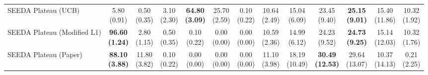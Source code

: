 \begin{table}[H]
{\begin{tabular}{l|cccccc|cccccc}
SEEDA Plateau (UCB) & \makecell{5.80 \\ (0.91)} & \makecell{0.50 \\ (0.35)} & {\cellcolor[HTML]{C8E6C9}} \makecell{3.10 \\ (2.30)} & \bfseries \makecell{64.80 \\ (3.09)} & \makecell{25.70 \\ (2.59)} & \makecell{0.10 \\ (0.22)} & \makecell{10.64 \\ (2.49)} & \makecell{15.04 \\ (6.09)} & {\cellcolor[HTML]{C8E6C9}} \makecell{23.45 \\ (9.40)} & \bfseries \makecell{25.15 \\ (9.01)} & \makecell{15.40 \\ (11.86)} & \makecell{10.32 \\ (1.92)} \\
SEEDA Plateau (Modified L1) & \bfseries \makecell{96.60 \\ (1.24)} & \makecell{2.80 \\ (1.15)} & {\cellcolor[HTML]{C8E6C9}} \makecell{0.50 \\ (0.35)} & \makecell{0.10 \\ (0.22)} & \makecell{0.00 \\ (0.00)} & \makecell{0.00 \\ (0.00)} & \makecell{10.59 \\ (2.36)} & \makecell{14.99 \\ (6.12)} & {\cellcolor[HTML]{C8E6C9}} \makecell{24.23 \\ (9.52)} & \bfseries \makecell{24.73 \\ (9.25)} & \makecell{15.14 \\ (12.03)} & \makecell{10.32 \\ (1.76)} \\
SEEDA Plateau (Paper) & \bfseries \makecell{88.10 \\ (3.88)} & \makecell{11.80 \\ (3.82)} & {\cellcolor[HTML]{C8E6C9}} \makecell{0.10 \\ (0.22)} & \makecell{0.00 \\ (0.00)} & \makecell{0.00 \\ (0.00)} & \makecell{0.00 \\ (0.00)} & \makecell{11.10 \\ (3.98)} & \makecell{18.19 \\ (10.49)} & {\cellcolor[HTML]{C8E6C9}} \bfseries \makecell{30.49 \\ (12.53)} & \makecell{29.64 \\ (13.07)} & \makecell{10.37 \\ (14.13)} & \makecell{0.21 \\ (2.25)} \\
\bottomrule
\end{tabular}
}%
\end{table}
